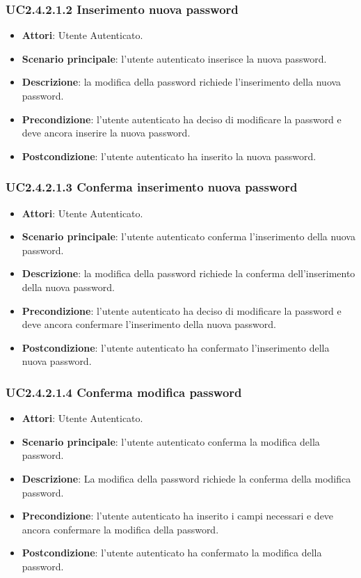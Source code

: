 \subsubsection{UC2.4.2.1.2 Inserimento nuova password}
\begin{itemize}
\item \textbf{Attori}: Utente Autenticato.
\item \textbf{Scenario principale}: l'utente autenticato inserisce la nuova password.
\item \textbf{Descrizione}: la modifica della password richiede l'inserimento della nuova password.
\item \textbf{Precondizione}: l'utente autenticato ha deciso di modificare la password e deve ancora inserire la nuova password.
\item \textbf{Postcondizione}: l'utente autenticato ha inserito la nuova password.
\end{itemize}
\subsubsection{UC2.4.2.1.3 Conferma inserimento nuova password}
\begin{itemize}
\item \textbf{Attori}: Utente Autenticato.
\item \textbf{Scenario principale}: l'utente autenticato conferma l'inserimento della nuova password.
\item \textbf{Descrizione}: la modifica della password richiede la conferma dell'inserimento della nuova password.
\item \textbf{Precondizione}: l'utente autenticato ha deciso di modificare la password e deve ancora confermare l'inserimento della nuova password.
\item \textbf{Postcondizione}: l'utente autenticato ha confermato l'inserimento della nuova password.
\end{itemize}
\subsubsection{UC2.4.2.1.4 Conferma modifica password}
\begin{itemize}
\item \textbf{Attori}: Utente Autenticato.
\item \textbf{Scenario principale}: l'utente autenticato conferma la modifica della password.
\item \textbf{Descrizione}: La modifica della password richiede la conferma della modifica password.
\item \textbf{Precondizione}: l'utente autenticato ha inserito i campi necessari e deve ancora confermare la modifica della password.
\item \textbf{Postcondizione}: l'utente autenticato ha confermato la modifica della password.
\end{itemize}
